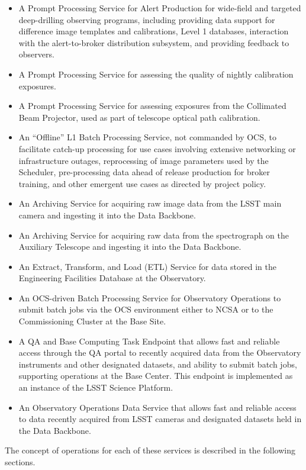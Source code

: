 \begin{itemize}
\item  A Prompt Processing Service for Alert Production for wide-field and
targeted deep-drilling observing programs, including providing data support for
difference image templates and calibrations, Level 1 databases, interaction with
the alert-to-broker distribution subsystem, and providing feedback to observers.
\item  A Prompt Processing Service for assessing the quality of nightly
calibration exposures.
\item  A Prompt Processing Service for assessing exposures from the Collimated
Beam Projector, used as part of telescope optical path calibration.
\item  An “Offline” L1 Batch Processing Service, not commanded by OCS, to
facilitate catch-up processing for use cases involving extensive networking or
infrastructure outages, reprocessing of image parameters used by the Scheduler,
pre-processing data ahead of release production for broker training, and other
emergent use cases as directed by project policy.
\item  An Archiving Service for acquiring raw image data from the LSST main
camera and ingesting it into the Data Backbone.
\item  An Archiving Service for acquiring raw data from the spectrograph on the
Auxiliary Telescope and ingesting it into the Data Backbone.
\item  An Extract, Transform, and Load (ETL) Service for data stored in the
Engineering Facilities Database at the Observatory.
\item  An OCS-driven Batch Processing Service for Observatory Operations to
submit batch jobs via the OCS environment either to NCSA or to the Commissioning
Cluster at the Base Site.
\item  A QA and Base Computing Task Endpoint that allows fast and reliable access
through the QA portal to recently acquired data from the Observatory instruments
and other designated datasets, and ability to submit batch jobs, supporting
operations at the Base Center.  This endpoint is implemented as an instance of
the LSST Science Platform.
\item  An Observatory Operations Data Service that allows fast and reliable
access to data recently acquired from LSST cameras and designated datasets held
in the Data Backbone.
\end{itemize}

The concept of operations for each of these services is described in the
following sections.


